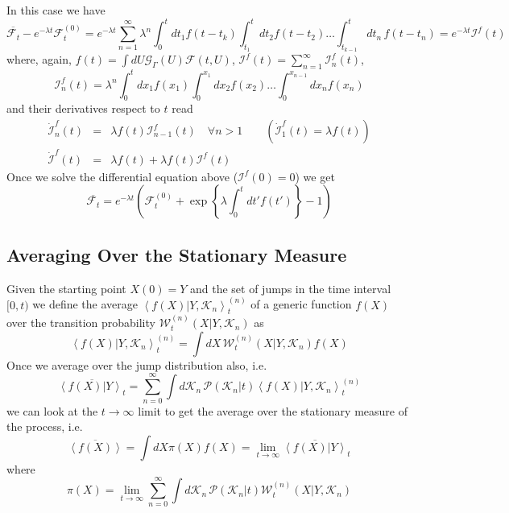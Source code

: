 \documentclass[12pt]{iopart}
\newcommand{\lx} {\left}
\newcommand{\rx} {\right}
\newcommand{\ave}[1] {\lx\langle #1 \rx\rangle}
\newcommand{\cP} {\mathcal{P}}
\newcommand{\cW} {\mathcal{W}}
\newcommand{\cG} {\mathcal{G}}
\newcommand{\cI} {\mathcal{I}}
\newcommand{\cK} {\mathcal{K}}
\newcommand{\cF} {\mathcal{F}}
\begin{document}
In this case we have
\begin{equation}
 \overline{\cF_t} - e^{-\lambda t}\cF^{(0)}_t = e^{-\lambda t} \sum_{n=1}^\infty \lambda^n \int_0^t d t_1 f(t-t_k) \int_{t_1}^t d t_2 f(t-t_2) \dots \int_{t_{k-1}}^t d t_n\, f(t-t_n) = e^{-\lambda t} \cI^f(t)
\end{equation}
where, again, $f(t) = \int dU \cG_{\Gamma}(U) \cF(t,U)$, $\cI^f(t)=\sum_{n=1}^\infty \cI^f_n(t)$, 
\begin{equation}
\cI^f_n(t) = \lambda^n \int_0^t dx_1 f(x_1) \int_0^{x_1} dx_2 f(x_2) \dots  \int_0^{x_{n-1}} dx_n f(x_n)\end{equation}
and their derivatives respect to $t$ read
\begin{eqnarray}
\dot{\cI}^f_n(t) &=& \lambda f(t) \cI^f_{n-1}(t) \quad \forall n>1 \qquad \lx(\dot{\cI}^f_1(t) = \lambda f(t)\rx)\\
\dot{\cI}^f(t) &=& \lambda f(t) + \lambda f(t) \cI^f(t)
\end{eqnarray}
Once we solve the differential equation above ($\cI^f(0)=0$) we get
\begin{equation}
    \overline{\cF_t} = e^{-\lambda t} \lx(\cF^{(0)}_t + \exp\lx\{\lambda \int_0^t dt' f(t')\rx\} - 1\rx)
\label{avejumppro}
\end{equation}
\subsection{Averaging Over the Stationary Measure}
Given the starting point $X(0)=Y$ and the set of jumps in the time interval $[0,t)$ we define the average $\ave{f(X)|Y,\cK_n}^{(n)}_t$ of a generic function $f(X)$ over the transition probability $\cW^{(n)}_t(X|Y,\cK_n)$ as
\begin{equation}
\ave{f(X)|Y,\cK_n}^{(n)}_t = \int dX\, \cW^{(n)}_t(X|Y,\cK_n) f(X)
\end{equation}
Once we average over the jump distribution also, i.e.
\begin{equation}
\overline{\ave{f(X)|Y}_t} = \sum_{n=0}^\infty \int d\cK_n\, \cP(\cK_n|t) \ave{f(X)|Y,\cK_n}^{(n)}_t
\end{equation}
we can look at the $t\to\infty$ limit to get the average over the stationary measure of the process, i.e.
\begin{equation}
 \overline{\ave{f(X)}} = \int dX \pi(X) f(X) = \lim_{t\to\infty} \overline{\ave{f(X)|Y}}_t
 \end{equation}
where
\begin{equation}
    \pi(X) = \lim_{t\to\infty} \sum_{n=0}^\infty \int d\cK_n\, \cP(\cK_n|t)  \cW^{(n)}_t(X|Y,\cK_n)
\end{equation}
\end{document}
